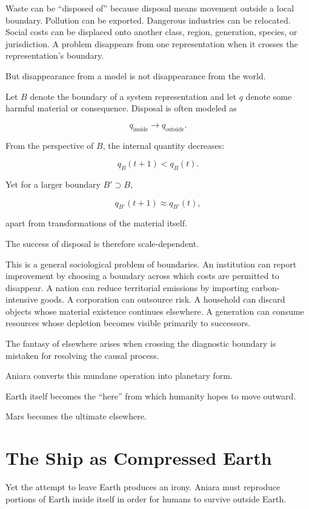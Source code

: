 \documentclass[11pt,oneside]{book}
\theoremstyle{definition}
\theoremstyle{remark}
\begin{document}
Waste can be ``disposed of'' because disposal means movement outside a local boundary. Pollution can be exported. Dangerous industries can be relocated. Social costs can be displaced onto another class, region, generation, species, or jurisdiction. A problem disappears from one representation when it crosses the representation's boundary.

But disappearance from a model is not disappearance from the world.

Let \(B\) denote the boundary of a system representation and let \(q\) denote some harmful material or consequence. Disposal is often modeled as

\[
q_{\mathrm{inside}}
\rightarrow
q_{\mathrm{outside}}.
\]

From the perspective of \(B\), the internal quantity decreases:

\[
q_B(t+1)<q_B(t).
\]

Yet for a larger boundary \(B'\supset B\),

\[
q_{B'}(t+1)
\approx
q_{B'}(t),
\]

apart from transformations of the material itself.

The success of disposal is therefore scale-dependent.

This is a general sociological problem of boundaries. An institution can report improvement by choosing a boundary across which costs are permitted to disappear. A nation can reduce territorial emissions by importing carbon-intensive goods. A corporation can outsource risk. A household can discard objects whose material existence continues elsewhere. A generation can consume resources whose depletion becomes visible primarily to successors.

The fantasy of elsewhere arises when crossing the diagnostic boundary is mistaken for resolving the causal process.

Aniara converts this mundane operation into planetary form.

Earth itself becomes the ``here'' from which humanity hopes to move outward.

Mars becomes the ultimate elsewhere.

\section{The Ship as Compressed Earth}

Yet the attempt to leave Earth produces an irony. Aniara must reproduce portions of Earth inside itself in order for humans to survive outside Earth.
\end{document}
